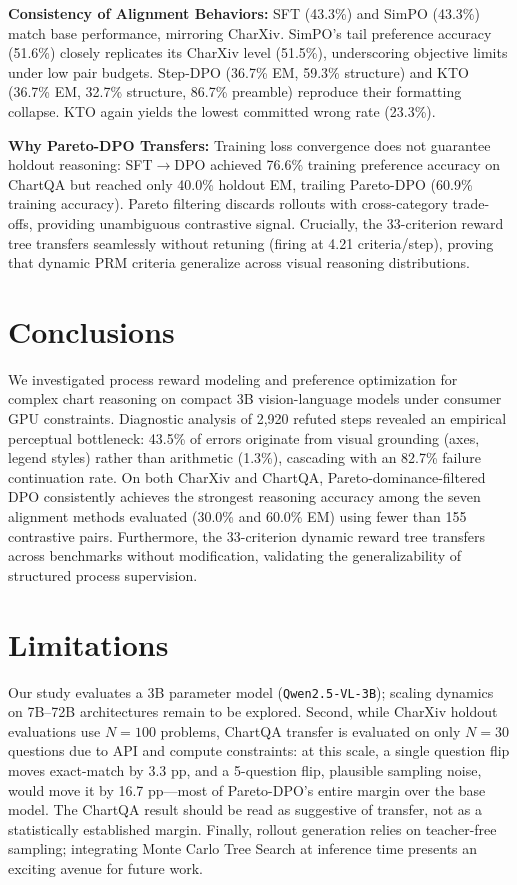 \documentclass[11pt]{article}
\begin{document}
\textbf{Consistency of Alignment Behaviors:} SFT (43.3\%) and SimPO (43.3\%) match base performance, mirroring CharXiv. SimPO's tail preference accuracy (51.6\%) closely replicates its CharXiv level (51.5\%), underscoring objective limits under low pair budgets. Step-DPO (36.7\% EM, 59.3\% structure) and KTO (36.7\% EM, 32.7\% structure, 86.7\% preamble) reproduce their formatting collapse. KTO again yields the lowest committed wrong rate (23.3\%).

\textbf{Why Pareto-DPO Transfers:} Training loss convergence does not guarantee holdout reasoning: SFT$\rightarrow$DPO achieved 76.6\% training preference accuracy on ChartQA but reached only 40.0\% holdout EM, trailing Pareto-DPO (60.9\% training accuracy). Pareto filtering discards rollouts with cross-category trade-offs, providing unambiguous contrastive signal. Crucially, the 33-criterion reward tree transfers seamlessly without retuning (firing at 4.21 criteria/step), proving that dynamic PRM criteria generalize across visual reasoning distributions.

\section{Conclusions}
\label{sec:conclusions}
We investigated process reward modeling and preference optimization for complex chart reasoning on compact 3B vision-language models under consumer GPU constraints. Diagnostic analysis of 2,920 refuted steps revealed an empirical perceptual bottleneck: 43.5\% of errors originate from visual grounding (axes, legend styles) rather than arithmetic (1.3\%), cascading with an 82.7\% failure continuation rate. On both CharXiv and ChartQA, Pareto-dominance-filtered DPO consistently achieves the strongest reasoning accuracy among the seven alignment methods evaluated (30.0\% and 60.0\% EM) using fewer than 155 contrastive pairs. Furthermore, the 33-criterion dynamic reward tree transfers across benchmarks without modification, validating the generalizability of structured process supervision.

\section*{Limitations}
\label{sec:limitations}
Our study evaluates a 3B parameter model (\texttt{Qwen2.5-VL-3B}); scaling dynamics on 7B--72B architectures remain to be explored. Second, while CharXiv holdout evaluations use $N=100$ problems, ChartQA transfer is evaluated on only $N=30$ questions due to API and compute constraints: at this scale, a single question flip moves exact-match by 3.3 pp, and a 5-question flip, plausible sampling noise, would move it by 16.7 pp---most of Pareto-DPO's entire margin over the base model. The ChartQA result should be read as suggestive of transfer, not as a statistically established margin. Finally, rollout generation relies on teacher-free sampling; integrating Monte Carlo Tree Search at inference time presents an exciting avenue for future work.
\end{document}
